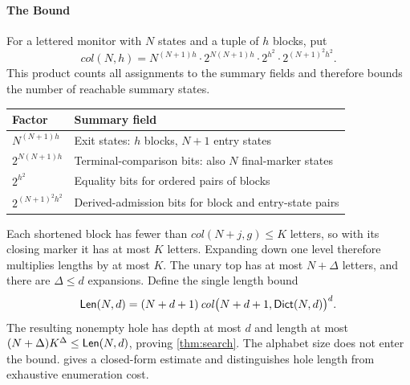 \paragraph{The Bound}
For a lettered monitor with $N$ states and a tuple of $h$ blocks, put
\begin{equation}\label{eq:col}
  \mathit{col}(N,h) = N^{(N+1)h}\cdot 2^{N(N+1)h}\cdot 2^{h^2}\cdot 2^{(N+1)^2h^2}.
\end{equation}
This product counts all assignments to the summary fields and therefore
bounds the number of reachable summary states.
\begin{center}
\begin{tabular}{@{}ll@{}}
\toprule
Factor & Summary field\\
\midrule
$N^{(N+1)h}$ & Exit states: $h$ blocks, $N+1$ entry states\\
$2^{N(N+1)h}$ & Terminal-comparison bits: also $N$ final-marker states\\
$2^{h^2}$ & Equality bits for ordered pairs of blocks\\
$2^{(N+1)^2h^2}$ & Derived-admission bits for block and entry-state pairs\\
\bottomrule
\end{tabular}
\end{center}
Each shortened block has fewer than $\mathit{col}(N+j,g)\le K$
letters, so with its closing marker it has at most $K$ letters. Expanding down
one level therefore multiplies lengths by at most $K$. The unary top has at most
$N+\Delta$ letters, and there are $\Delta\le d$ expansions. Define the single length bound
\begin{equation}\label{eq:holebound}
 \mathsf{Len}(N,d)=(N+d+1)\,
       \mathit{col}\bigl(N+d+1,\mathsf{Dict}(N,d)\bigr)^d.
\end{equation}
The resulting nonempty hole has depth at most $d$ and length at most
$(N+\Delta)K^\Delta\le\mathsf{Len}(N,d)$, proving \cref{thm:search}.
The alphabet size does not enter the bound. 
gives a closed-form estimate and distinguishes hole length from
exhaustive enumeration cost.

\FloatBarrier
